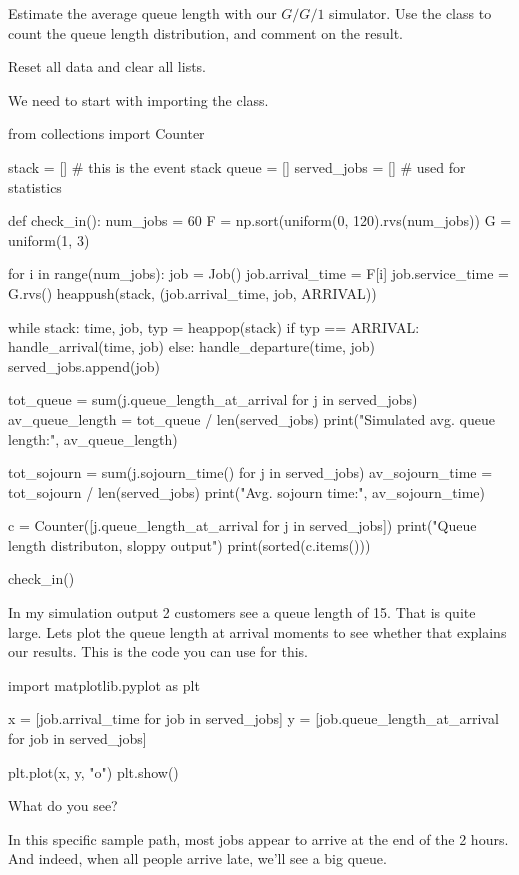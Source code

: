 \begin{exercise}
  Estimate the average queue length with our $G/G/1$ simulator. Use the  class to count the queue length distribution, and comment on the result.
\begin{hint}
Reset all data and clear all lists.
\end{hint}

\begin{solution}
We need to start with importing the  class.
\begin{pyverbatim}
from collections import Counter

stack = []  # this is the event stack
queue = []
served_jobs = []  # used for statistics


def check_in():
    num_jobs = 60
    F = np.sort(uniform(0, 120).rvs(num_jobs))
    G = uniform(1, 3)

    for i in range(num_jobs):
        job = Job()
        job.arrival_time = F[i]
        job.service_time = G.rvs()
        heappush(stack, (job.arrival_time, job, ARRIVAL))

    while stack:
        time, job, typ = heappop(stack)
        if typ == ARRIVAL:
            handle_arrival(time, job)
        else:
            handle_departure(time, job)
            served_jobs.append(job)

    tot_queue = sum(j.queue_length_at_arrival for j in served_jobs)
    av_queue_length = tot_queue / len(served_jobs)
    print("Simulated avg. queue length:", av_queue_length)

    tot_sojourn = sum(j.sojourn_time() for j in served_jobs)
    av_sojourn_time = tot_sojourn / len(served_jobs)
    print("Avg. sojourn time:", av_sojourn_time)

    c = Counter([j.queue_length_at_arrival for j in served_jobs])
    print("Queue length distributon, sloppy output")
    print(sorted(c.items()))


check_in()
\end{pyverbatim}
  \end{solution}
\end{exercise}



\begin{exercise}
In my simulation output 2 customers see a queue length of 15. That is quite large. Lets plot the queue length at arrival moments to see whether that explains our results. 
This is the code you can use for this.
\begin{pyverbatim}
import matplotlib.pyplot as plt

x = [job.arrival_time for job in served_jobs]
y = [job.queue_length_at_arrival for job in served_jobs]

plt.plot(x, y, "o")
plt.show()
\end{pyverbatim}
What do you see? 
\begin{solution}
  In this specific sample path, most jobs appear to arrive at the end of the 2 hours. And indeed, when all people arrive late, we'll see a big queue. 
\end{solution}

\end{exercise}


